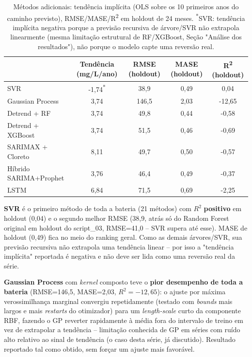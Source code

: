 \begin{table}[H]
    \centering
    \small
    \begin{tabular}{l|c|c|c|c}
         & Tendência (mg/L/ano) & RMSE (holdout) & MASE (holdout) & R\textsuperscript{2} (holdout) \\ \hline
        SVR & -1,74\textsuperscript{*} & 38,9 & 0,49 & 0,04 \\
        Gaussian Process & 3,74 & 146,5 & 2,03 & -12,65 \\
        Detrend + RF & 3,74 & 49,8 & 0,44 & -0,58 \\
        Detrend + XGBoost & 3,74 & 51,5 & 0,46 & -0,69 \\
        SARIMAX + Cloreto & 8,11 & 49,7 & 0,50 & -0,57 \\
        Híbrido SARIMA+Prophet & 3,76 & 46,4 & 0,49 & -0,37 \\
        LSTM & 6,84 & 71,5 & 0,69 & -2,25 \\
    \end{tabular}
    \caption{Métodos adicionais: tendência implícita (OLS sobre os 10 primeiros anos do caminho previsto), RMSE/MASE/R\textsuperscript{2} em holdout de 24 meses. \textsuperscript{*}SVR: tendência implícita negativa porque a previsão recursiva de árvore/SVR não extrapola linearmente (mesma limitação estrutural de RF/XGBoost, Seção "Análise dos resultados"), não porque o modelo capte uma reversão real.}
    \label{tab:metodos-adicionais}
\end{table}

\textbf{SVR} é o primeiro método de toda a bateria (21 métodos) com $R^2$ \textbf{positivo} em holdout (0,04) e o segundo melhor RMSE (38,9, atrás só do Random Forest original em holdout do script\_03, RMSE=41,0 -- SVR supera até esse). MASE de holdout (0,49) fica no meio do ranking geral. Como as demais árvores/SVR, sua previsão recursiva não extrapola uma tendência linear -- por isso a "tendência implícita" reportada é negativa e não deve ser lida como uma reversão real da série.

\textbf{Gaussian Process} com \textit{kernel} composto teve o \textbf{pior desempenho de toda a bateria} (RMSE=146,5, MASE=2,03, $R^2=-12,65$): o ajuste por máxima verossimilhança marginal convergiu repetidamente (testado com \textit{bounds} mais largos e mais \textit{restarts} do otimizador) para um \textit{length-scale} curto da componente RBF, fazendo o GP reverter rapidamente à média fora do intervalo de treino em vez de extrapolar a tendência -- limitação conhecida de GP em séries com ruído alto relativo ao sinal de tendência (o caso desta série, já discutido). Resultado reportado tal como obtido, sem forçar um ajuste mais favorável.


